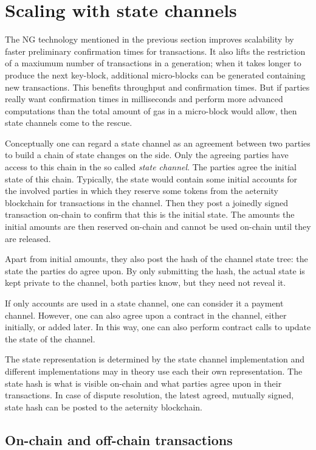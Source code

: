 \section{Scaling with state channels}
\label{sect:channels}

The NG technology mentioned in the previous section improves
scalability by faster preliminary confirmation times for
transactions. It also lifts the restriction of a maxiumum number of transactions in a
generation; when it takes longer to produce the next key-block,
additional micro-blocks can be generated containing new transactions.
This benefits throughput and confirmation times. But if parties really
want confirmation times in milliseconds and perform more advanced
computations than the total amount of gas in a micro-block would
allow, then state channels come to the rescue.

Conceptually one can regard a state channel as an agreement between
two parties to build a chain of state changes on the side. Only the
agreeing parties have access to this chain in the so called
\textit{state channel}. The parties agree the initial
state of this chain. Typically, the state would
contain some initial accounts for the involved parties in which they
reserve some tokens from the aeternity blockchain for transactions in
the channel. Then they post a joinedly signed transaction on-chain to
confirm that this is the initial state.
The amounts the initial amounts are then reserved on-chain and cannot
be used on-chain until they are released.

Apart from initial amounts,
they also post the hash of the channel state tree: the state the
parties do agree upon. By only submitting the hash, the actual state
is kept private to the channel, both parties know, but they need not
reveal it.

If only accounts are used in a state channel, one can consider it a
payment channel. However, one can also agree upon a contract in the
channel, either initially, or added later. In this way, one can also
perform contract calls to update the state of the channel.

The state representation is determined by the state channel
implementation and different implementations may in theory use each
their own representation. The state hash is what is visible on-chain
and what parties agree upon in their transactions.
In case of dispute resolution, the
latest agreed, mutually signed, state hash can be posted to the aeternity blockchain.

\subsection{On-chain and off-chain transactions}

